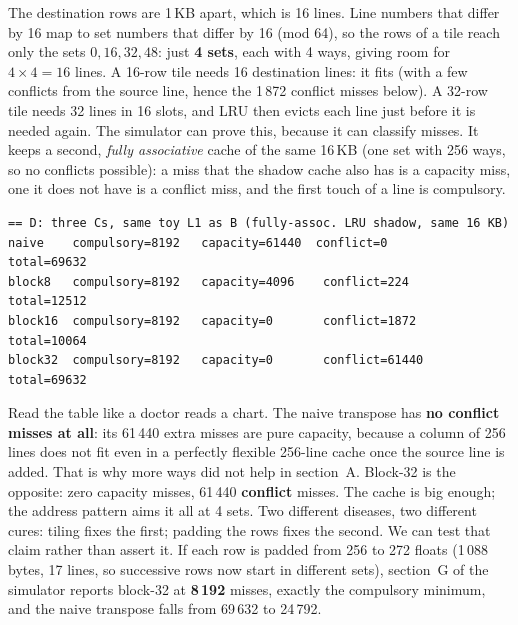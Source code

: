 \begin{example}
The destination rows are 1\,KB apart, which is 16 lines. Line numbers
that differ by 16 map to set numbers that differ by 16 (mod 64), so the
rows of a tile reach only the sets \(0,16,32,48\): just \textbf{4
sets}, each with 4 ways, giving room for \(4\times4=16\) lines. A
16-row tile needs 16 destination lines: it fits (with a few conflicts
from the source line, hence the 1\,872 conflict misses below). A 32-row
tile needs 32 lines in 16 slots, and LRU then evicts each line just
before it is needed again. The simulator can prove this, because it can
classify misses. It keeps a second, \emph{fully associative} cache of the
same 16\,KB (one set with 256 ways, so no conflicts possible): a miss
that the shadow cache also has is a capacity miss, one it does not have is
a conflict miss, and the first touch of a line is compulsory.

\begin{lstlisting}[language={},label={lst:threec10},caption={Section D of
\texttt{./ch10\_cache\_sim}: the three Cs of each transpose on the toy
L1.}]
== D: three Cs, same toy L1 as B (fully-assoc. LRU shadow, same 16 KB)
naive    compulsory=8192   capacity=61440  conflict=0       total=69632
block8   compulsory=8192   capacity=4096    conflict=224     total=12512
block16  compulsory=8192   capacity=0       conflict=1872    total=10064
block32  compulsory=8192   capacity=0       conflict=61440   total=69632
\end{lstlisting}

\noindent Read the table like a doctor reads a chart. The naive
transpose has \textbf{no conflict misses at all}: its 61\,440 extra misses
are pure capacity, because a column of 256 lines does not fit even in a
perfectly flexible 256-line cache once the source line is added. That is
why more ways did not help in section~A. Block-32 is the opposite: zero
capacity misses, 61\,440 \textbf{conflict} misses. The cache is big
enough; the address pattern aims it all at 4 sets. Two different
diseases, two different cures: tiling fixes the first; padding the rows fixes the second. We can test
that claim rather than assert it. If each row is padded from 256 to 272
floats (1\,088 bytes, 17 lines, so successive rows now start in
different sets), section~G of the simulator reports block-32 at
\textbf{8\,192} misses, exactly the compulsory minimum, and the naive
transpose falls from 69\,632 to 24\,792.
\end{example}

